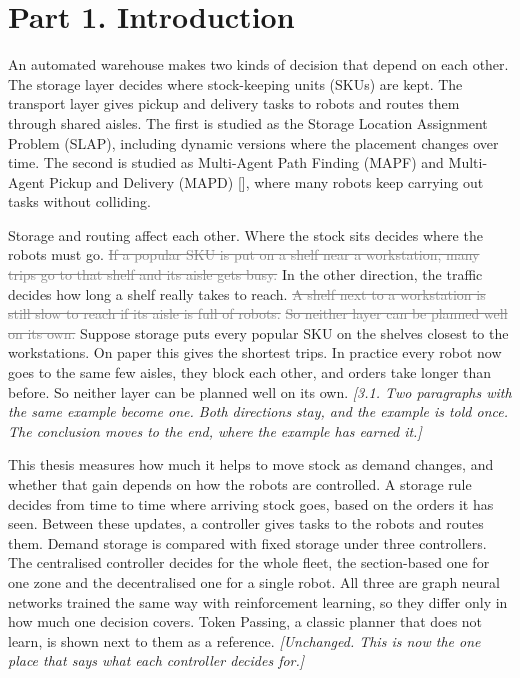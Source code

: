 \documentclass[11pt,a4paper]{article}
\newcommand{\new}[1]{\textcolor{newc}{#1}}
\newcommand{\old}[1]{\textcolor{gray}{\sout{#1}}}
\newcommand{\note}[1]{{\small\itshape [#1]}}
\newcommand{\lab}[1]{\textsf{\footnotesize\detokenize{#1}}}
\newcommand{\citep}[1]{[\lab{#1}]}
\begin{document}
\section*{Part 1. Introduction}

An automated warehouse makes two kinds of decision that depend on each
other. The storage layer decides where stock-keeping units (SKUs) are kept.
The transport layer gives pickup and delivery tasks to robots and routes
them through shared aisles. The first is studied as the Storage Location
Assignment Problem (SLAP), including dynamic versions where the placement
changes over time. The second is studied as Multi-Agent Path Finding (MAPF)
and Multi-Agent Pickup and Delivery (MAPD) \citep{ma2017lifelong_mapf},
where many robots keep carrying out tasks without colliding.

Storage and routing affect each other. Where the stock sits decides where
the robots must go. \old{If a popular SKU is put on a shelf near a
workstation, many trips go to that shelf and its aisle gets busy.} In the
other direction, the traffic decides how long a shelf really takes to
reach. \old{A shelf next to a workstation is still slow to reach if its
aisle is full of robots.}
\old{So neither layer can be planned well on its own.} Suppose storage puts
every popular SKU on the shelves closest to the workstations. On paper this
gives the shortest trips. In practice every robot now goes to the same few
aisles, they block each other, and orders take longer than before.
\new{So neither layer can be planned well on its own.}
\note{3.1. Two paragraphs with the same example become one. Both directions
stay, and the example is told once. The conclusion moves to the end, where
the example has earned it.}

This thesis measures how much it helps to move stock as demand changes, and
whether that gain depends on how the robots are controlled. A storage rule
decides from time to time where arriving stock goes, based on the orders it
has seen. Between these updates, a controller gives tasks to the robots and
routes them. Demand storage is compared with fixed storage under three
controllers. The centralised controller decides for the whole fleet, the
section-based one for one zone and the decentralised one for a single
robot. All three are graph neural networks trained the same way with
reinforcement learning, so they differ only in how much one decision
covers. Token Passing, a classic planner that does not learn, is shown next
to them as a reference.
\note{Unchanged. This is now the one place that says what each controller
decides for.}
\end{document}
